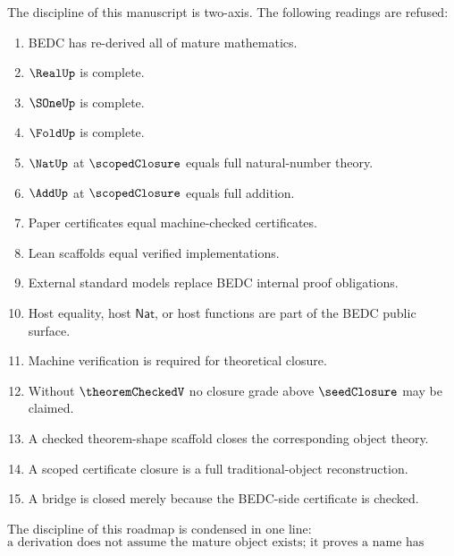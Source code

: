 The discipline of this manuscript is two-axis. The following readings are refused:
\begin{enumerate}
  \item BEDC has re-derived all of mature mathematics.
  \item $\RealUp$ is complete.
  \item $\SOneUp$ is complete.
  \item $\FoldUp$ is complete.
  \item $\NatUp$ at $\scopedClosure$ equals full natural-number theory.
  \item $\AddUp$ at $\scopedClosure$ equals full addition.
  \item Paper certificates equal machine-checked certificates.
  \item Lean scaffolds equal verified implementations.
  \item External standard models replace BEDC internal proof obligations.
  \item Host equality, host $\mathsf{Nat}$, or host functions are part of the BEDC public surface.
  \item Machine verification is required for theoretical closure.
  \item Without $\theoremCheckedV$ no closure grade above $\seedClosure$ may be claimed.
  \item A checked theorem-shape scaffold closes the corresponding object theory.
  \item A scoped certificate closure is a full traditional-object reconstruction.
  \item A bridge is closed merely because the BEDC-side certificate is checked.
\end{enumerate}

The discipline of this roadmap is condensed in one line:
$$
\boxed{\text{a derivation does not assume the mature object exists; it proves a name has earned the right to be used.}}
$$
